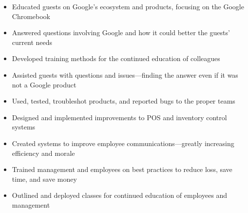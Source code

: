 \documentclass[letterpaper]{article}        %
\begin{document}


  
  \begin{itemize}
  
  \item Educated guests on Google's ecosystem and products, focusing on the Google Chromebook
  
  \item Answered questions involving Google and how it could better the guests' current needs
  
  \item Developed training methods for the continued education of colleagues
  
  \item Assisted guests with questions and issues---finding the answer even if it was not a Google product
  
  \item Used, tested, troubleshot products, and reported bugs to the proper teams
  
  \end{itemize}
  
  
  
  \begin{itemize}
  
  \item Designed and implemented improvements to POS and inventory control systems
  
  \item Created systems to improve employee communications---greatly increasing efficiency and morale
  
  \item Trained management and employees on best practices to reduce loss, save time, and save money
  
  \item Outlined and deployed classes for continued education of employees and management
  
  \end{itemize}
  
\end{document}
